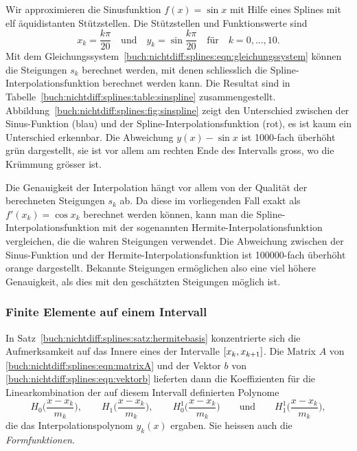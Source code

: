 \begin{beispiel}
\label{buch:nichtdiff:splines:bsp:sinspline}


Wir approximieren die Sinusfunktion $f(x)=\sin x$ mit Hilfe eines Splines
mit elf äquidistanten Stützstellen.
Die Stützstellen und Funktionswerte sind
\[
x_k = \frac{k\pi}{20}
\quad\text{und}\quad
y_k = \sin\frac{k\pi}{20}
\quad\text{für}\quad
k=0,\dots,10.
\]
Mit dem Gleichungssystem~\eqref{buch:nichtdiff:splines:eqn:gleichungssystem}
können die Steigungen $s_k$ berechnet werden, mit denen schliesslich die
Spline-Interpolationsfunktion berechnet werden kann.
Die Resultat sind in Tabelle~\ref{buch:nichtdiff:splines:table:sinspline}
zusammengestellt.
Abbildung~\ref{buch:nichtdiff:splines:fig:sinspline} zeigt den Unterschied
zwischen der Sinus-Funktion (blau) und der Spline-Interpolationsfunktion (rot),
es ist kaum ein Unterschied erkennbar.
Die Abweichung $y(x)-\sin x$ ist 1000-fach überhöht grün dargestellt, sie
ist vor allem am rechten Ende des Intervalls gross, wo die Krümmung grösser
ist.

Die Genauigkeit der Interpolation hängt vor allem von der Qualität der 
berechneten Steigungen $s_k$ ab.
Da diese im vorliegenden Fall exakt als $f'(x_k) = \cos x_k$ berechnet
werden können, kann man die Spline-Interpolationsfunktion mit der sogenannten
Hermite-Interpolationsfunktion vergleichen, die die wahren Steigungen
verwendet.
Die Abweichung zwischen der Sinus-Funktion und der
Hermite-Interpolationsfunktion ist 100000-fach überhöht orange dargestellt.
Bekannte Steigungen ermöglichen also eine viel höhere Genauigkeit, als dies
mit den geschätzten Steigungen möglich ist.
\end{beispiel}

%
%
\subsubsection{Finite Elemente auf einem Intervall}
In Satz~\ref{buch:nichtdiff:splines:satz:hermitebasis} konzentrierte sich
die Aufmerksamkeit auf das Innere eines der Intervalle
$[x_{k\mathstrut},x_{k+1\mathstrut}]$.
Die Matrix $A$ von
\eqref{buch:nichtdiff:splines:eqn:matrixA}
und der Vektor $b$ von
\eqref{buch:nichtdiff:splines:eqn:vektorb}
lieferten dann die Koeffizienten für die Linearkombination der
auf diesem Intervall definierten Polynome
\[
H_0\biggl(\frac{x-x_k}{m_k}\biggr),
\qquad
H_1\biggl(\frac{x-x_k}{m_k}\biggr),
\qquad
H_0^1\biggl(\frac{x-x_k}{m_k}\biggr)
\qquad\text{und}\qquad
H_1^1\biggl(\frac{x-x_k}{m_k}\biggr),
\]
die das Interpolationspolynom $y_k(x)$ ergaben.
Sie heissen auch die {\em Formfunktionen}.
%

